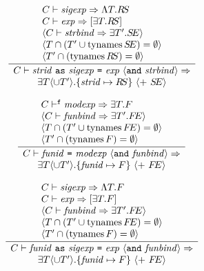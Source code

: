\begin{equation}                %
\label{asstrbinder-rule}
\frac{ \begin{array}{l}
       \C\ts\sigexp\ra\sig{\T}{\RS} \\
       \C\ts\exp\ra\packagetype{\exmod{\T}{\RS}}\\
       \langle \C\ts\strbind\ra\EXISTS{\T'}{\SE} \rangle \\
       \langle \T \cap (\T' \cup \TyNamesFcn \SE) = \emptyset \rangle\\
       \langle \T' \cap (\TyNamesFcn \RS) = \emptyset \rangle
       \end{array}
     }
     {\begin{array}{c}
       \C\ts\asstrbinder\ra\\
         \EXISTS{\T\langle\cup\T'\rangle}
           {\{\strid\mapsto\RS\}\ \langle +\ \SE\rangle}
        \end{array} 
       }
\end{equation}

\begin{equation}                %
\label{funbinder-rule}
\frac{ \begin{array}{l}
       \C\ts^\expectfun\modexp\ra\exmod{\T}{\F} \\
       \langle \C\ts\funbind\ra\EXISTS{\T'}{\FE} \rangle \\
       \langle \T \cap (\T' \cup \TyNamesFcn \FE) = \emptyset \rangle\\
       \langle \T' \cap (\TyNamesFcn \F) = \emptyset \rangle
       \end{array}
     }
     {\begin{array}{c}
       \C\ts\funbinder\ra\\
         \EXISTS{\T\langle\cup\T'\rangle}
           {\{\funid\mapsto\F\}\ \langle +\ \FE\rangle}
        \end{array} 
       }
\end{equation}

\begin{equation}                %
\label{asfunbinder-rule}
\frac{ \begin{array}{l}
       \C\ts\sigexp\ra\sig{\T}{\F} \\
       \C\ts\exp\ra\packagetype{\exmod{\T}{\F}}\\
       \langle \C\ts\funbind\ra\EXISTS{\T'}{\FE} \rangle \\
       \langle \T \cap (\T' \cup \TyNamesFcn \FE) = \emptyset \rangle\\
       \langle \T' \cap (\TyNamesFcn \F) = \emptyset \rangle
       \end{array}
     }
     {\begin{array}{c}
       \C\ts\asfunbinder\ra\\
         \EXISTS{\T\langle\cup\T'\rangle}
           {\{\funid\mapsto\F\}\ \langle +\ \FE\rangle}
        \end{array} 
       }
\end{equation}

